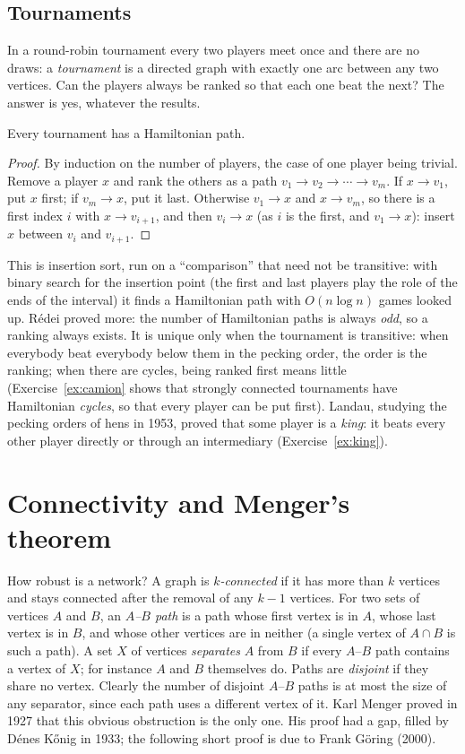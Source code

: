\subsection*{Tournaments}

In a round-robin tournament every two players meet once and there are no draws: a \emph{tournament} is a directed graph with exactly
one arc between any two vertices. Can the players always be ranked so that each one beat the next? The answer is yes,
whatever the results.

\begin{theorem}[R\'edei, 1934]\label{thm:redei}
Every tournament has a Hamiltonian path.
\end{theorem}
\begin{proof}
By induction on the number of players, the case of one player being trivial. Remove a player $x$ and rank the others as a path
$v_1\to v_2\to\cdots\to v_m$. If $x\to v_1$, put $x$ first; if $v_m\to x$, put it last. Otherwise $v_1\to x$ and $x\to v_m$, so there is a first index $i$ with
$x\to v_{i+1}$, and then $v_i\to x$ (as $i$ is the first, and $v_1\to x$): insert $x$ between $v_i$ and $v_{i+1}$.
\end{proof}

This is insertion sort, run on a ``comparison'' that need not be transitive: with binary search for the insertion point
(the first and last players play the role of the ends of the interval) it finds a Hamiltonian path with $O(n\log n)$ games looked
up. R\'edei proved more: the number of Hamiltonian paths is always \emph{odd}, so a ranking always exists. It is unique only when the
tournament is transitive: when everybody beat everybody below them in the
pecking order, the order is the ranking; when there are cycles, being ranked first means little (Exercise~\ref{ex:camion} shows
that strongly connected tournaments have Hamiltonian \emph{cycles}, so that every player can be put first). Landau, studying the
pecking orders of hens in 1953, proved that some player is a \emph{king}: it beats every other player directly or through an
intermediary (Exercise~\ref{ex:king}).

\section{Connectivity and Menger's theorem}

How robust is a network? A graph is \emph{$k$-connected} if it has more than $k$ vertices and stays connected after the removal of any $k-1$
vertices. For two sets of vertices $A$ and $B$, an \emph{$A$--$B$ path} is a path whose first vertex is in $A$, whose last vertex is in $B$, and whose
other vertices are in neither (a single vertex of $A\cap B$ is such a path). A set $X$ of vertices \emph{separates} $A$ from $B$ if every $A$--$B$ path
contains a vertex of $X$; for instance $A$ and $B$ themselves do. Paths are \emph{disjoint} if they share no vertex. Clearly the number of
disjoint $A$--$B$ paths is at most the size of any separator, since each path uses a different vertex of it. Karl Menger proved in
1927 that this obvious obstruction is the only one. His proof had a gap, filled by D\'enes K\H onig in 1933; the following short
proof is due to Frank G\"oring (2000).

